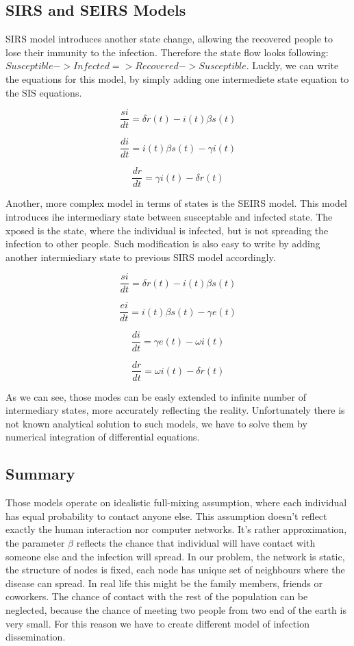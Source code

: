 \documentclass[nostrict]{szablonPG}
\begin{document}
\subsection{SIRS and SEIRS Models}
SIRS model introduces another state change, allowing the recovered people to lose their immunity to the infection. Therefore the state flow looks following: $Susceptible -> Infected => Recovered -> Susceptible$. Luckly, we can write the equations for this model, by simply adding one intermediete state equation to the SIS equations.

\[\frac{si}{dt} = \delta r(t) - i(t) \beta s(t)\]

\[\frac{di}{dt} = i(t) \beta s(t) - \gamma i(t)\]

\[\frac{dr}{dt} = \gamma i(t) - \delta r(t)\]


Another, more complex model in terms of states is the SEIRS model. This model introduces ihe intermediary state between susceptable and infected state. The xposed is the state, where the individual is infected, but is not spreading the infection to other people. Such modification is also easy to write by adding another intermiediary state to previous SIRS model accordingly.

\[\frac{si}{dt} = \delta r(t) - i(t) \beta s(t)\]

\[\frac{ei}{dt} = i(t) \beta s(t) - \gamma e(t)\]

\[\frac{di}{dt} = \gamma e(t) - \omega i(t)\]

\[\frac{dr}{dt} = \omega i(t) - \delta r(t)\]

As we can see, those modes can be easly extended to infinite number of intermediary states, more accurately reflecting the reality. Unfortunately there is not known analytical solution to such models, we have to solve them by numerical integration of  differential equations.

\subsection{Summary}
Those models operate on idealistic full-mixing assumption, where each individual has equal probability to contact anyone else. This assumption doesn't reflect exactly the human interaction nor computer networks. It's rather approximation, the parameter $\beta$ reflects the chance that individual will have contact with someone else and the infection will spread. In our problem, the network is static, the structure of nodes is fixed, each node has unique set of neighbours where the disease can spread. In real life this might be the family members, friends or coworkers. The chance of contact with the rest of the population can be neglected, because the chance of meeting two people from two end of the earth is very small. For this reason we have to create different model of infection dissemination. 
\end{document}
